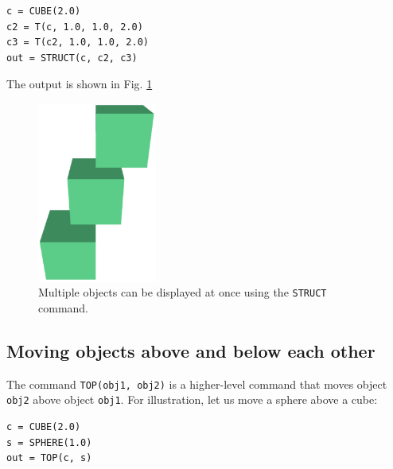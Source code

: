 \begin{bbox}
\begin{verbatim}
c = CUBE(2.0)
c2 = T(c, 1.0, 1.0, 2.0)
c3 = T(c2, 1.0, 1.0, 2.0)
out = STRUCT(c, c2, c3)
\end{verbatim}
\end{bbox}
\vspace{6mm}

\noindent
The output is shown in Fig. \ref{fig:comp-1}
\begin{figure}[!ht]
\begin{center}
\includegraphics[width=0.35\textwidth]{img/comp-1.png}
\end{center}
\vspace{-4mm}
\caption{Multiple objects can be displayed at once using the {\tt STRUCT} command.}
\label{fig:comp-1}
\end{figure}


\subsection{Moving objects above and below each other}

The command {\tt TOP(obj1, obj2)} is a higher-level command that 
moves object {\tt obj2} above object {\tt obj1}. 
For illustration, let us move a sphere above a cube:\\

\begin{bbox}
\begin{verbatim}
c = CUBE(2.0)
s = SPHERE(1.0)
out = TOP(c, s)
\end{verbatim}
\end{bbox}
\vspace{6mm}

